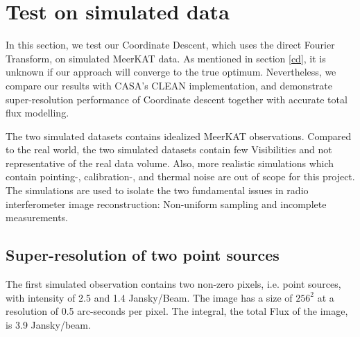 \section{Test on simulated data}\label{results}
In this section, we test our Coordinate Descent, which uses the direct Fourier Transform, on simulated MeerKAT data. As mentioned in section \ref{cd}, it is unknown if our approach will converge to the true optimum. Nevertheless, we compare our results with CASA's CLEAN implementation, and demonstrate super-resolution performance of Coordinate descent together with accurate total flux modelling.

The two simulated datasets contains idealized MeerKAT observations. Compared to the real world, the two simulated datasets contain few Visibilities and not representative of the real data volume. Also, more realistic simulations which contain pointing-, calibration-, and thermal noise are out of scope for this project. The simulations are used to isolate the two fundamental issues in radio interferometer image reconstruction: Non-uniform sampling and incomplete measurements.

\subsection{Super-resolution of two point sources}
The first simulated observation contains two non-zero pixels, i.e. point sources, with intensity of 2.5 and 1.4 Jansky/Beam. The image has a size of $256^2$ at a resolution of 0.5 arc-seconds per pixel. The integral, the total Flux of the image, is 3.9 Jansky/beam.

